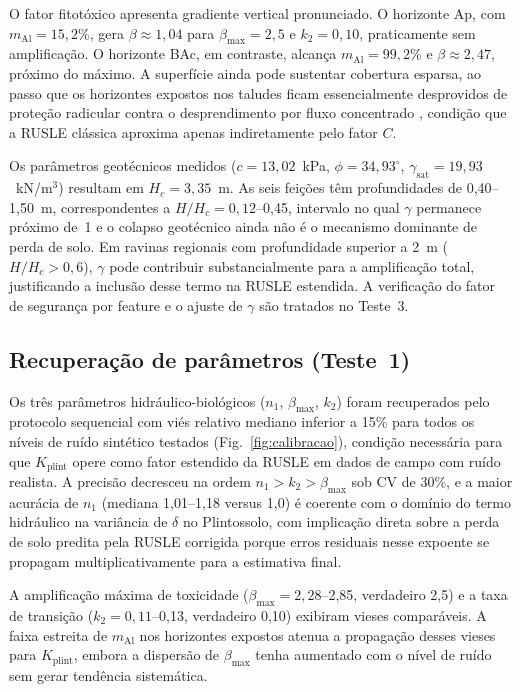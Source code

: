 \documentclass[preprint,review,12pt,authoryear]{elsarticle}
\begin{document}
O fator fitotóxico apresenta gradiente vertical pronunciado. O horizonte Ap, com $m_{\mathrm{Al}} = 15{,}2\%$, gera $\beta \approx 1{,}04$ para $\beta_{\max} = 2{,}5$ e $k_2 = 0{,}10$, praticamente sem amplificação. O horizonte BAc, em contraste, alcança $m_{\mathrm{Al}} = 99{,}2\%$ e $\beta \approx 2{,}47$, próximo do máximo. A superfície ainda pode sustentar cobertura esparsa, ao passo que os horizontes expostos nos taludes ficam essencialmente desprovidos de proteção radicular contra o desprendimento por fluxo concentrado \citep{vannoppen_2015}, condição que a RUSLE clássica aproxima apenas indiretamente pelo fator $C$.

Os parâmetros geotécnicos medidos ($c = 13{,}02$~kPa, $\phi = 34{,}93^\circ$, $\gamma_{\mathrm{sat}} = 19{,}93$~kN/m$^3$) resultam em $H_c = 3{,}35$~m. As seis feições têm profundidades de 0,40--1,50~m, correspondentes a $H/H_c = 0{,}12$--0,45, intervalo no qual $\gamma$ permanece próximo de~1 e o colapso geotécnico ainda não é o mecanismo dominante de perda de solo. Em ravinas regionais com profundidade superior a 2~m ($H/H_c > 0{,}6$), $\gamma$ pode contribuir substancialmente para a amplificação total, justificando a inclusão desse termo na RUSLE estendida. A verificação do fator de segurança por feature e o ajuste de $\gamma$ são tratados no Teste~3.

\subsection{Recuperação de parâmetros (Teste~1)}

Os três parâmetros hidráulico-biológicos ($n_1$, $\beta_{\max}$, $k_2$) foram recuperados pelo protocolo sequencial com viés relativo mediano inferior a 15\% para todos os níveis de ruído sintético testados (Fig.~\ref{fig:calibracao}), condição necessária para que $K_{\mathrm{plint}}$ opere como fator estendido da RUSLE em dados de campo com ruído realista. A precisão decresceu na ordem $n_1 > k_2 > \beta_{\max}$ sob CV de 30\%, e a maior acurácia de $n_1$ (mediana 1,01--1,18 versus 1,0) é coerente com o domínio do termo hidráulico na variância de $\delta$ no Plintossolo, com implicação direta sobre a perda de solo predita pela RUSLE corrigida porque erros residuais nesse expoente se propagam multiplicativamente para a estimativa final.

A amplificação máxima de toxicidade ($\beta_{\max} = 2{,}28$--2,85, verdadeiro 2,5) e a taxa de transição ($k_2 = 0{,}11$--0,13, verdadeiro 0,10) exibiram vieses comparáveis. A faixa estreita de $m_{\mathrm{Al}}$ nos horizontes expostos atenua a propagação desses vieses para $K_{\mathrm{plint}}$, embora a dispersão de $\beta_{\max}$ tenha aumentado com o nível de ruído sem gerar tendência sistemática.
\end{document}
